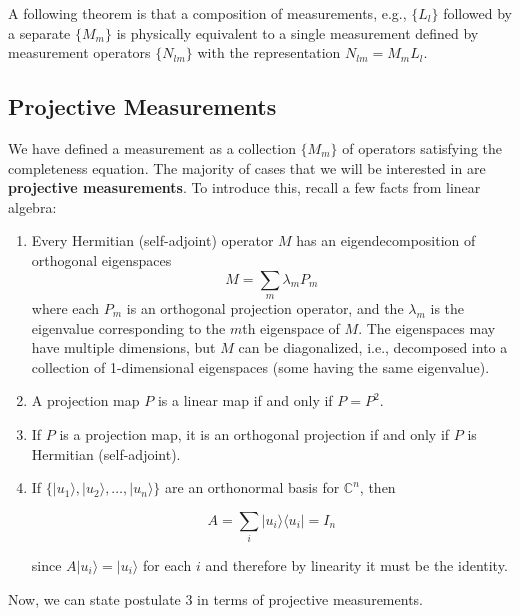 \documentclass{article}
\theoremstyle{definition}
\begin{document}
    A following theorem is that a composition of measurements, e.g., $\{L_l\}$ followed by a separate $\{M_m\}$ is physically equivalent to a single measurement defined by measurement operators $\{N_{lm}\}$ with the representation $N_{lm} = M_m L_l$.

  \subsection{Projective Measurements}

    We have defined a measurement as a collection $\{ M_m\}$ of operators satisfying the completeness equation. The majority of cases that we will be interested in are \textbf{projective measurements}. To introduce this, recall a few facts from linear algebra:
    \begin{enumerate}
      \item Every Hermitian (self-adjoint) operator $M$ has an eigendecomposition of orthogonal eigenspaces
        \[M = \sum_m \lambda_m P_m\]
      where each $P_m$ is an orthogonal projection operator, and the $\lambda_m$ is the eigenvalue corresponding to the $m$th eigenspace of $M$. The eigenspaces may have multiple dimensions, but $M$ can be diagonalized, i.e., decomposed into a collection of 1-dimensional eigenspaces (some having the same eigenvalue).

      \item A projection map $P$ is a linear map if and only if $P = P^2$.

      \item If $P$ is a projection map, it is an orthogonal projection if and only if $P$ is Hermitian (self-adjoint).

      \item If $\{ |u_1 \rangle, |u_2 \rangle, \ldots, |u_n \rangle \}$ are an orthonormal basis for $\mathbb{C}^n$, then

        \[A = \sum_i |u_i \rangle \langle u_i | = I_n\]

      since $A |u_i \rangle = |u_i \rangle$ for each $i$ and therefore by linearity it must be the identity.
    \end{enumerate}

    Now, we can state postulate 3 in terms of projective measurements. 
\end{document}
